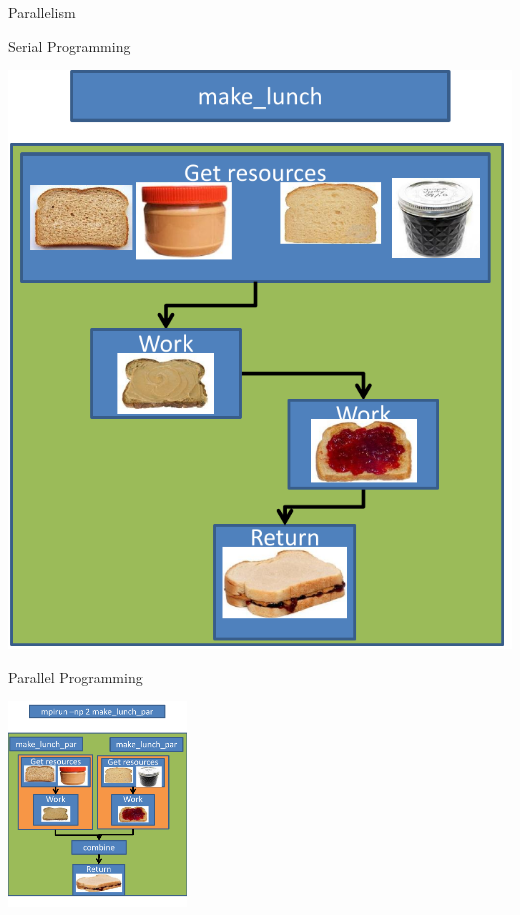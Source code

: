 \begin{frame}
  \begin{block}{Parallelism}\pause
    \begin{center}
    \begin{minipage}{.46\textwidth}
    \begin{block}{Serial Programming}
      \begin{center}
      \includegraphics[width=.975\textwidth]{pics/analogy_serial}
      \end{center}
      \end{block}
    \end{minipage}
    \hspace{.15cm}
    \begin{minipage}{.46\textwidth}
    \begin{block}{Parallel Programming}
      \begin{center}
      \includegraphics[height=5.45cm,width=.975\textwidth]{pics/analogy_parallel}
      \end{center}
      \end{block}
    \end{minipage}
    \end{center}
  \end{block}
\end{frame}

